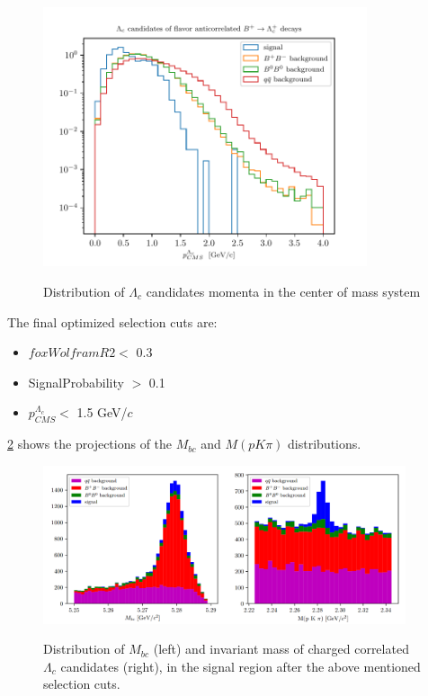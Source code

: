     \begin{figure}[H]
        {\includegraphics[width=0.85\textwidth]{03-Selection/figs/acorr_chargedB_Lambda_c_CMS_P.pdf}}
        \caption{Distribution of  $\Lambda_c$ candidates momenta in the center of mass system}
        \label{fig:acorr_chargedB_Lambda_c_CMS_P}
        \end{figure}
        
The final optimized selection cuts are:

        \begin{itemize}
            \item $foxWolframR2  < $  0.3
            \item SignalProbability $>$ 0.1
            \item $p^{\Lambda_c}_{CMS} <$ 1.5 GeV/$c$
        \end{itemize}
        
\cref{fig:acorr_chargedBMbc_InvM_optimizedSelection_SigR} shows the projections of the $M_{bc} $ and $M(p K \pi)$ distributions.

        \begin{figure}[H]
            {\includegraphics[width=0.95\textwidth]{03-Selection/figs/acorr_chargedB_Mbc_InvM_opt_cuts.png}}
            \caption{Distribution of $M_{bc} $ (left) and invariant mass of charged correlated $\Lambda_c$  candidates (right), in the signal region after the above mentioned selection cuts.}
            \label{fig:acorr_chargedBMbc_InvM_optimizedSelection_SigR}
            \end{figure}
               


